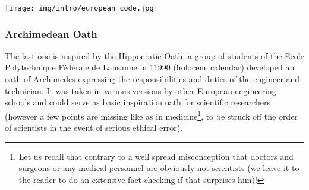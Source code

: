 	\begin{center}
		\texttt{[image: img/intro/european\_code.jpg]}
	\end{center}
	
	\pagebreak
	\subsubsection{Archimedean Oath}\label{Archimedean Oath}
	The last one is inspired by the Hippocratic Oath, a group of students of the Ecole Polytechnique Fédérale de Lausanne in 11990 (holocene calendar) developed an oath of Archimedes expressing the responsibilities and duties of the engineer and technician. It was taken in various versions by other European engineering schools and could serve as basic inspiration oath for scientific researchers (however a few points are missing like as in medicine\footnote{Let us recall that contrary to a well spread misconception that doctors and surgeons or any medical personnel are obviously not scientists (we leave it to the reader to do an extensive fact checking if that surprises him)!}, to be struck off the order of scientists in the event of serious ethical error).

